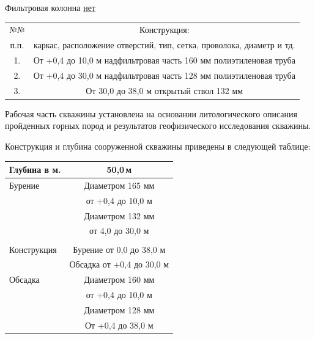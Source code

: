 \documentclass[a4paper,12pt]{article} %
\DeclareRobustCommand{\diameter}{%
	\text{\usefont{LS1}{stixscr}{m}{n}\symbol{"60}}%
}
\newcommand{\txtDepth}{50,0}						%
\begin{document}
    \bigskip
	
	Фильтровая колонна \underline{нет}
	
	\bigskip

\begin{tabular}{|c|c|}
	\hline 
	\rule[-1ex]{0pt}{2.5ex} №№ & Конструкция: \\ 
	\rule[-1ex]{0pt}{2.5ex} п.п. & каркас, расположение отверстий, тип, сетка, проволока, диаметр и тд. \\ 
	\hline 
	\rule[-1ex]{0pt}{2.5ex} 1. & От +0,4 до 10,0 м   надфильтровая часть \diameter 160 мм полиэтиленовая труба \\ 
	\hline 
	\rule[-1ex]{0pt}{2.5ex} 2. & От +0,4 до 30,0 м   надфильтровая часть \diameter 128 мм полиэтиленовая труба \\ 
	\hline 
	\rule[-1ex]{0pt}{2.5ex} 3. & От 30,0 до 38,0 м   открытый ствол \diameter 132 мм \\ 
	\hline 
\end{tabular} 

\bigskip

Рабочая часть скважины установлена на основании литологического описания пройденных горных пород и результатов геофизического исследования скважины.


Конструкция и глубина сооруженной скважины приведены в следующей таблице:

\bigskip

\begin{center}
\begin{tabular}{|l|c|}
	\hline 
	Глубина в м. & \txtDepth \,м \\ 
	\hline 
	Бурение & Диаметром 165 мм \\ 
	& от +0,4 до 10,0 м \\ 
	& Диаметром 132 мм \\ 
	& от 4,0 до 30,0 м \\ 
	&  \\ 
	\hline 
	Конструкция & Бурение от 0,0 до 38,0 м \\ 
	& Обсадка от +0,4 до 30,0 м \\ 
	\hline 
	Обсадка & Диаметром 160 мм \\ 
	& от +0,4 до 10,0 м \\ 
	& Диаметром 128 мм  \\ 
	& От +0,4 до 38,0 м \\ 
	\hline 
\end{tabular} 
\end{center}
\end{document}
